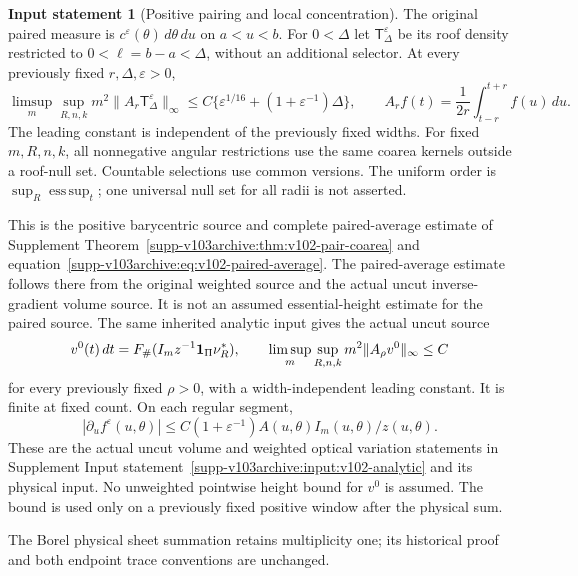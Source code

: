 \documentclass[11pt,reqno]{amsart}
\numberwithin{equation}{section}
\theoremstyle{definition}\newtheorem{definition}[theorem]{Definition}
\theoremstyle{remark}\newtheorem{remark}[theorem]{Remark}
\theoremstyle{definition}\newtheorem{inputstatement}[theorem]{Input statement}
\newcommand{\esssup}{\operatorname*{ess\,sup}}
\begin{document}
\begin{inputstatement}[Positive pairing and local concentration]
\label{input:v104-pair}
The original paired measure is
$c^\varepsilon(\theta)\,d\theta\,du$ on $a<u<b$.
For $0<\Delta$ let $\mathsf T_\Delta^\varepsilon$ be its roof
density restricted to $0<\ell=b-a<\Delta$, without an additional
selector. At every previously fixed $r,\Delta,\varepsilon>0$,
\begin{equation}\label{eq:v104-paired-average}
 \limsup_m\sup_{R,n,k}m^2
       \|A_r\mathsf T_\Delta^\varepsilon\|_\infty
 \le C\{\varepsilon^{1/16}+(1+\varepsilon^{-1})\Delta\},
 \qquad A_rf(t)=\frac1{2r}\int_{t-r}^{t+r}f(u)\,du.
\end{equation}
The leading constant is independent of the previously fixed widths.
For fixed $m,R,n,k$, all nonnegative angular restrictions use the
same coarea kernels outside a roof-null set. Countable selections
use common versions. The uniform order is $\sup_R\esssup_t$;
one universal null set for all radii is not asserted.
\end{inputstatement}
This is the positive barycentric source and complete paired-average
estimate of Supplement Theorem~\ref{supp-v103archive:thm:v102-pair-coarea}
and equation~\eqref{supp-v103archive:eq:v102-paired-average}.
The paired-average estimate follows there from the original weighted
source and the actual uncut inverse-gradient volume source. It is
not an assumed essential-height estimate for the paired source.
The same inherited analytic input gives the actual uncut source
\begin{equation}\label{eq:v104-uncut-input}
 v^0(t)\,dt=F_\#(I_m z^{-1}\one_\Pi\nu_R^*),\qquad
 \limsup_m\sup_{R,n,k}m^2\|A_\rho v^0\|_\infty\le C
\end{equation}
for every previously fixed $\rho>0$, with a width-independent leading
constant. It is finite at fixed count. On each regular segment,
\begin{equation}\label{eq:v104-weighted-variation-input}
 |\partial_u f^\varepsilon(u,\theta)|
 \le C(1+\varepsilon^{-1})A(u,\theta)I_m(u,\theta)/z(u,\theta).
\end{equation}
These are the actual uncut volume and weighted optical variation
statements in Supplement Input statement~\ref{supp-v103archive:input:v102-analytic}
and its physical input. No unweighted pointwise height bound for
$v^0$ is assumed. The bound is used only on a previously fixed
positive window after the physical sum.

The Borel physical sheet summation retains multiplicity one; its
historical proof and both endpoint trace conventions are unchanged.
\end{document}
